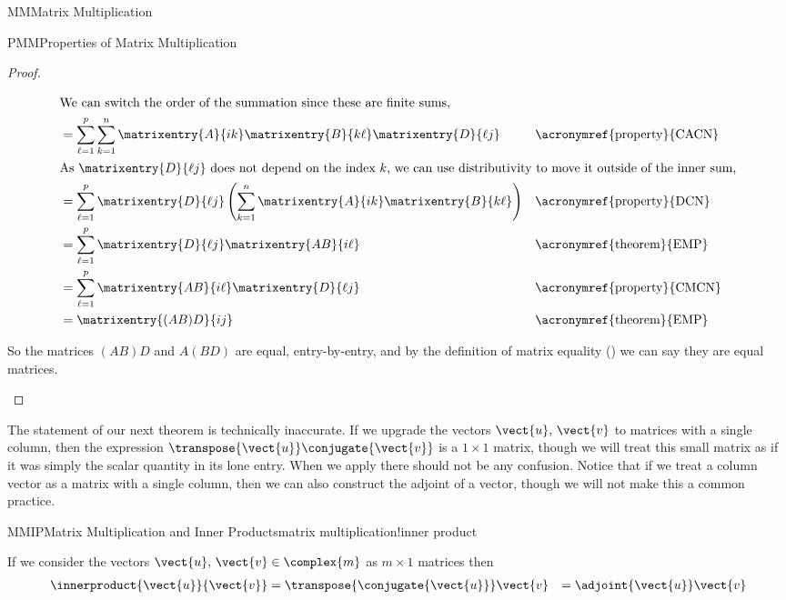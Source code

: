 \begin{subsect}{MM}{Matrix Multiplication}
\begin{subsect}{PMM}{Properties of Matrix Multiplication}
\begin{proof}
\begin{para}
\begin{align*}
%
\intertext{We can switch the order of the summation since these are finite sums,}
%
&=\sum_{\ell=1}^{p}\sum_{k=1}^{n}\matrixentry{A}{ik}\matrixentry{B}{k\ell}\matrixentry{D}{\ell j}
&&\text{\acronymref{property}{CACN}}\\
%
\intertext{As $\matrixentry{D}{\ell j}$ does not depend on the index $k$, we can use distributivity to move it outside of the inner sum,}
%
&=\sum_{\ell=1}^{p}\matrixentry{D}{\ell j}\left(\sum_{k=1}^{n}\matrixentry{A}{ik}\matrixentry{B}{k\ell}\right)
&&\text{\acronymref{property}{DCN}}\\
&=\sum_{\ell=1}^{p}\matrixentry{D}{\ell j}\matrixentry{AB}{i\ell}
&&\text{\acronymref{theorem}{EMP}}\\
&=\sum_{\ell=1}^{p}\matrixentry{AB}{i\ell}\matrixentry{D}{\ell j}
&&\text{\acronymref{property}{CMCN}}\\
&=\matrixentry{(AB)D}{ij}&&\text{\acronymref{theorem}{EMP}}
\end{align*}
\end{para}
%
\begin{para}So the matrices $(AB)D$ and $A(BD)$ are equal, entry-by-entry, and by the definition of matrix equality () we can say they are equal matrices.\end{para}
%
\end{proof}
%
\begin{para}The statement of our next theorem is technically inaccurate.  If we upgrade the vectors $\vect{u},\,\vect{v}$ to matrices with a single column, then the expression $\transpose{\vect{u}}\conjugate{\vect{v}}$ is a $1\times 1$ matrix, though we will treat this small matrix as if it was simply the scalar quantity in its lone entry.  When we apply  there should not be any confusion.  Notice that if we treat a column vector as a matrix with a single column, then we can also construct the adjoint of a vector, though we will not make this a common practice.\end{para}
%
\begin{theorem}{MMIP}{Matrix Multiplication and Inner Products}{matrix multiplication!inner product}
\begin{para}If we consider the vectors $\vect{u},\,\vect{v}\in\complex{m}$ as $m\times 1$ matrices then
%
\begin{align*}
\innerproduct{\vect{u}}{\vect{v}}
&=\transpose{\conjugate{\vect{u}}}\vect{v}
&=\adjoint{\vect{u}}\vect{v}
\end{align*}
\end{para}

\end{theorem}
\end{subsect}
\end{subsect}

